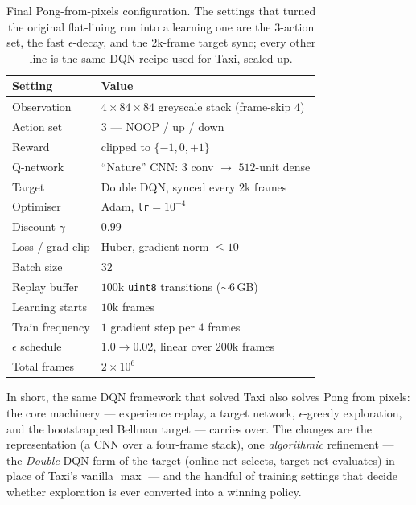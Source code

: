 \documentclass[11pt]{article}
\begin{document}
\begin{table}[h]
\centering
\small
\begin{tabular}{@{}ll@{}}
\toprule
\textbf{Setting} & \textbf{Value} \\
\midrule
Observation         & $4\times84\times84$ greyscale stack (frame-skip $4$) \\
Action set          & $3$ --- NOOP / up / down \\
Reward              & clipped to $\{-1,0,+1\}$ \\
Q-network           & ``Nature'' CNN: 3 conv $\to$ $512$-unit dense \\
Target              & Double DQN, synced every $2$k frames \\
\midrule
Optimiser           & Adam, \texttt{lr}$=10^{-4}$ \\
Discount $\gamma$   & $0.99$ \\
Loss / grad clip    & Huber, gradient-norm $\le 10$ \\
Batch size          & $32$ \\
Replay buffer       & $100$k \texttt{uint8} transitions (${\sim}6$\,GB) \\
Learning starts     & $10$k frames \\
Train frequency     & $1$ gradient step per $4$ frames \\
$\epsilon$ schedule & $1.0 \to 0.02$, linear over $200$k frames \\
Total frames        & $2{\times}10^{6}$ \\
\bottomrule
\end{tabular}
\caption{Final Pong-from-pixels configuration. The settings that turned the original flat-lining run
into a learning one are the $3$-action set, the fast $\epsilon$-decay, and the $2$k-frame target sync;
every other line is the same DQN recipe used for Taxi, scaled up.}
\label{tab:pong-config}
\end{table}

In short, the same DQN framework that solved Taxi also solves Pong from pixels: the core machinery ---
experience replay, a target network, $\epsilon$-greedy exploration, and the bootstrapped Bellman target
--- carries over. The changes are the representation (a CNN over a four-frame stack), one
\emph{algorithmic} refinement --- the \emph{Double}-DQN form of the target (online net selects, target
net evaluates) in place of Taxi's vanilla $\max$ --- and the handful of training settings that decide
whether exploration is ever converted into a winning policy.
\end{document}
